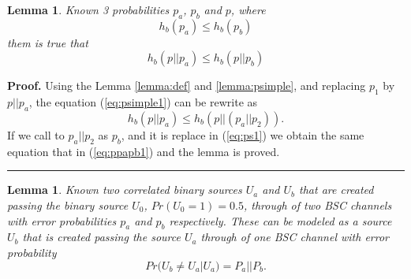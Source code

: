 \documentclass[a4paper,10pt]{article}
\newtheorem{mylemma}[mytheorem]{Lemma}
\newenvironment{myproof}[1][Proof]{\textbf{#1.} }{\ \rule{0.5em}{0.5em}}
\begin{document}
\begin{mdframed}[style=MDFStyGrayScreen]
\begin{mylemma}
\label{lemma:ppapb} 
Known 3 probabilities $p_a$, $p_b$ and $p$, where
\begin{equation} \label{eq:ppapb0}
h_b(p_a) \leq h_b(p_b) 
\end{equation}
them is true that
\begin{equation} \label{eq:ppapb1}
h_b(p||p_a) \leq h_b(p||p_b) 
\end{equation}
\end{mylemma}
\end{mdframed}

\begin{myproof}
\label{proof:ppapb} 
Using the Lemma \ref{lemma:def} and \ref{lemma:psimple}, and replacing 
$p_1$ by $p || p_a$, the equation (\ref{eq:psimple1}) can be rewrite as 
\begin{equation} \label{eq:ps1}
h_b(p || p_a) \leq h_b(p|| (p_a||p_2)).
\end{equation}
If we call to $p_a||p_2$ as $p_b$, and it is replace in (\ref{eq:ps1}) we obtain
the same equation that in (\ref{eq:ppapb1}) and the lemma is proved.
\end{myproof}
\begin{mdframed}[style=MDFStyGrayScreen]
\begin{mylemma}
\label{lemma:twoparbsc}
Known two correlated binary sources $U_a$ and $U_b$ that are created passing 
the binary source $U_0$, $Pr(U_0=1)=0.5$, through of two BSC channels with  
error probabilities $p_a$ and $p_b$ respectively. These can be modeled as a 
source $U_b$ that is created passing the source $U_a$ through of one BSC 
channel with  error probability 
\begin{equation} \label{eq:tpb0}
Pr(U_b \neq U_a|U_a)=P_a || P_b.
\end{equation}
\end{mylemma}
\end{mdframed}
\end{document}

